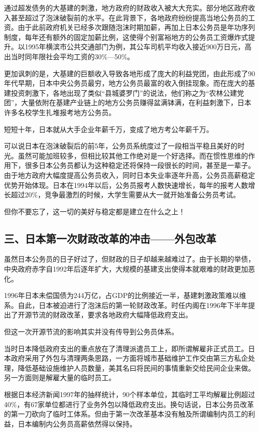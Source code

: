 通过超发债务的大基建的刺激，地方政府的财政收入被大大充实。部分地区政府收入甚至超过了泡沫破裂前的水平。在此背景下，各地政府纷纷提高当地公务员的工资。由于此前政府机关已经多次跟随泡沫时期加薪，再加上日本公务员是年功序列制度，每年还有额外的固定加薪比例，这使得个别富裕地方的公务员工资爆炸式提升。以1995年横滨市公共交通部门为例，其公车司机平均收入接近900万日元，高出当时同年限社会平均工资的30\%—50\%。

更加讽刺的是，大基建的巨额收入导致各地形成了庞大的利益党团，由此形成了90年代早期，日本中央公务员最穷，地方公务员最富的收入倒挂现象。而在庞大的基建投资刺激下，各地出现了类似“县城婆罗门”的说法，他们称之为“农林公建党团”，大量依附在基建产业链上的地方公务员赚得盆满钵满，在利益刺激下，日本许多名校学生扎堆报考地方公务员。

短短十年，日本就从大手企业年薪千万，变成了地方考公年薪千万。

可以说日本在泡沫破裂后的前5年，公务员系统度过了一段相当平稳且美好的时光。虽然可能加班较多，但相比较其他工作绝对是一个好选择。而在惯性思维的作用下，很多日本公务员都认为这种稳定还将保持一段很长的时间，甚至是一辈子。由于地方政府大幅度提高公务员收入，同时日本失业率逐年升高，公务员高薪稳定优势开始体现。日本在1994年以后，公务员报考人数快速增长，每年的报考人数增长超过20\%，竞争最激烈的时候，大学生需要从大一就开始准备公务员考试。

但你不要忘了，这一切的美好与稳定都是建立在什么之上！

\subsection{三、日本第一次财政改革的冲击——外包改革}

虽然日本公务员的日子好过了，但财政的日子却越来越难过了。由于长期的举债，中央政府赤字自1992年后逐年扩大，大规模的基建支出使得本就艰难的财政更加恶化。

1996年日本未偿国债为244万亿，占GDP的比例接近一半，基建刺激政策难以维系。自此，日本被迫进行了泡沫后的第一轮财政改革。时任内阁在1996年下半年提出了开源节流的财政改革，要求各地政府大幅降低政府支出。

但这一次开源节流的影响其实并没有传导到公务员体系。

当时日本降低政府支出的重点放在了清理派遣员工上，即所谓解雇非正式员工。日本政府采用了外包与清理两条思路，一方面将城市基础维护工作交由第三方私企处理，降低基础设施维护人员数量，美其名曰将民间的事情重新交给民间企业来做。另一方面则是解雇大量的临时员工。

根据日本经济新闻1997年的抽样统计，90个样本单位，其临时工平均解雇比例超过40\%，有67家单位都进行了业务外包以降低政府支出。换句话说，日本公务员改革的第一刀砍向了临时工体系。但由于第一次改革基本没有触及所谓编制内员工的利益，日本编制内公务员高薪依然得以保持。

